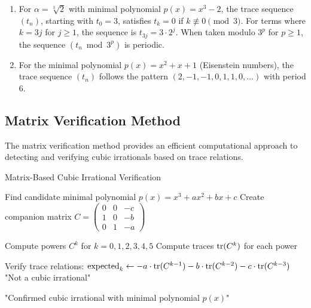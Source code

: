 \begin{proposition}
\begin{enumerate}
    \item For $\alpha = \sqrt[3]{2}$ with minimal polynomial $p(x) = x^3 - 2$, the trace sequence $(t_n)$, starting with $t_0=3$, satisfies $t_k = 0$ if $k \not\equiv 0 \pmod{3}$. For terms where $k = 3j$ for $j \geq 1$, the sequence is $t_{3j} = 3 \cdot 2^j$. When taken modulo $3^p$ for $p \ge 1$, the sequence $(t_n \bmod{3^p})$ is periodic.

    \item For the minimal polynomial $p(x) = x^2 + x + 1$ (Eisenstein numbers), the trace sequence $(t_n)$ follows the pattern $(2, -1, -1, 0, 1, 1, 0, ...)$ with period 6.
\end{enumerate}
\end{proposition}

\subsection{Matrix Verification Method}

The matrix verification method provides an efficient computational approach to detecting and verifying cubic irrationals based on trace relations.

\begin{algorithm}
\caption{Matrix-Based Cubic Irrational Verification}
\label{alg:matrix_verification}
\begin{algorithmic}[1]
    \State Find candidate minimal polynomial $p(x) = x^3 + ax^2 + bx + c$
    \State Create companion matrix $C = \begin{pmatrix} 0 & 0 & -c \\ 1 & 0 & -b \\ 0 & 1 & -a \end{pmatrix}$

    \State Compute powers $C^k$ for $k = 0, 1, 2, 3, 4, 5$
    \State Compute traces $\operatorname{tr}(C^k)$ for each power

    \State Verify trace relations:
        \State $\text{expected}_k \gets -a \cdot \operatorname{tr}(C^{k-1}) - b \cdot \operatorname{tr}(C^{k-2}) - c \cdot \operatorname{tr}(C^{k-3})$
            \State \Return "Not a cubic irrational"
        \EndIf
    \EndFor

    \State \Return "Confirmed cubic irrational with minimal polynomial $p(x)$"
\EndProcedure
\end{algorithmic}
\end{algorithm}

